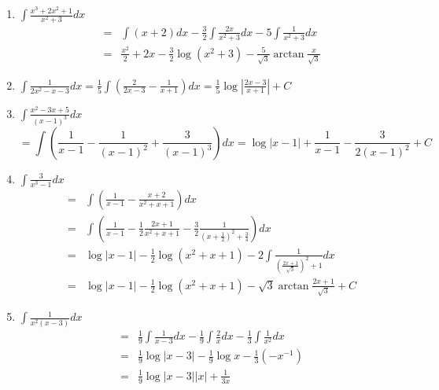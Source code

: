 
\begin{eg}
\begin{enumerate}
\item ${\displaystyle \int{}dx}$
\begin{eqnarray*}
\mbox{} &= & \int(x+2)dx -\frac32\int\frac{2x}{x^2+3}dx - 5\int\frac{1}{x^2+3}dx \\
   	& = & \frac{x^2}{2} + 2x -\frac32\log(x^2+3) - \frac5{\sqrt{3}}\arctan\frac{x}{\sqrt{3}}
\end{eqnarray*}
\item ${\displaystyle \int{}dx = \int\left( - \right)dx = \log\left|\right| + C}$
\item ${\displaystyle \int{}dx}$
$$ = \int\left(\frac{1}{x-1} - \frac{1}{(x-1)^2} + \frac{3}{(x-1)^3}\right)dx = \log|x-1| + \frac{1}{x-1} - \frac{3}{2(x-1)^2} + C$$
\item ${\displaystyle \int{}dx}$
\begin{eqnarray*}
\mbox{}& = & \int \left(\frac{1}{x-1} - \frac{x+2}{x^2+x+1}\right)dx\\
& = & \int\left(\frac{1}{x-1}-\frac12\frac{2x+1}{x^2+x+1}-\frac32\frac{1}{(x+\frac12)^2+\frac34}\right)dx \\
& = & \log|x-1| - \frac12\log(x^2+x+1) - 2\int\frac{1}{\left(\frac{2x+1}{\sqrt{3}}\right)^2+1}dx\\
& = & \log|x-1| -\frac12\log(x^2+x+1)-\sqrt{3}\arctan\frac{2x+1}{\sqrt{3}}+C
\end{eqnarray*}
\item ${\displaystyle \int{}dx}$
\begin{eqnarray*}
\mbox{} &= & \frac19\int\frac{1}{x-3}dx - \frac19\int\frac2xdx - \frac13\int\frac{1}{x^2}dx\\
& = & \frac19\log|x-3| -\frac{1}{9}\log x - \frac13(-x^{-1})\\
& = & \frac19\log{|x-3|}{|x|} + \frac{1}{3x}
\end{eqnarray*}
\end{enumerate}
\end{eg}

